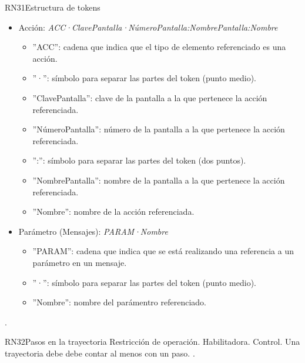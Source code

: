 \begin{BussinesRule}{RN31}{Estructura de tokens}
\begin{itemize}
\begin{itemize}
			\item '':'': símbolo para separar las partes del token (dos puntos).
			\item ''NombreCasoUso'': nombre del caso de uso al que pertenece el paso referenciado.
			\item ''ClaveTrayectoria'': clave de la trayectoria a la que pertenece el paso referenciado.
			\item ''Número'': número del paso referenciado.
		\end{itemize}
	\item Acción: {\em ACC·ClavePantalla·NúmeroPantalla:NombrePantalla:Nombre}
		\begin{itemize}
			\item ''ACC'': cadena que indica que el tipo de elemento referenciado es una acción.
			\item ''·'':  símbolo para separar las partes del token (punto medio).
			\item ''ClavePantalla'': clave de la pantalla a la que pertenece la acción referenciada.
			\item ''NúmeroPantalla'': número de la pantalla a la que pertenece la acción referenciada.
			\item '':'': símbolo para separar las partes del token (dos puntos).
			\item ''NombrePantalla'': nombre de la pantalla a la que pertenece la acción referenciada.
			\item ''Nombre'': nombre de la acción referenciada.
		\end{itemize}
	\item Parámetro (Mensajes): {\em PARAM·Nombre}
		\begin{itemize}
			\item ''PARAM'': cadena que indica que se está realizando una referencia a un parámetro en un mensaje.
			\item ''·'':  símbolo para separar las partes del token (punto medio).
			\item ''Nombre'': nombre del parámentro referenciado.
		\end{itemize}
	\end{itemize}
	 \UCref{}{}. 
\end{BussinesRule}


\begin{BussinesRule}{RN32}{Pasos en la trayectoria} 
	\BRitem[Tipo:] Restricción de operación. 
	\BRitem[Clase:] Habilitadora. 
	\BRitem[Nivel:] Control. %
	\BRitem[Descripción:] Una trayectoria debe debe contar al menos con un paso.
	 \UCref{}{}. 
\end{BussinesRule}

